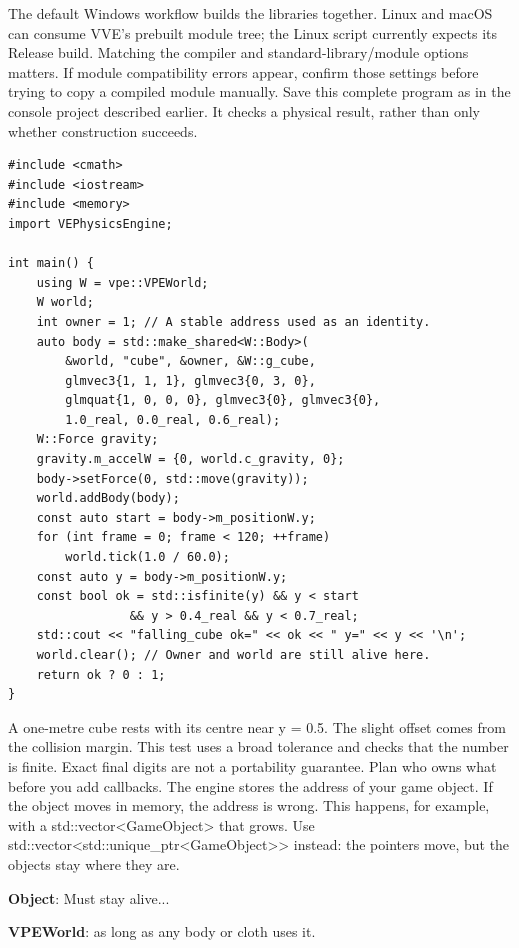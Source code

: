 \documentclass[11pt,a4paper]{article}
\begin{document}
The default Windows workflow builds the libraries together. Linux and macOS can consume VVE's prebuilt module tree; the Linux script currently expects its Release build. Matching the compiler and standard-library/module options matters. If module compatibility errors appear, confirm those settings before trying to copy a compiled module manually.
\label{vpe-core-20}Save this complete program as  in the console project described earlier. It checks a physical result, rather than only whether construction succeeds.%
\begin{lstlisting}
#include <cmath>
#include <iostream>
#include <memory>
import VEPhysicsEngine;

int main() {
    using W = vpe::VPEWorld;
    W world;
    int owner = 1; // A stable address used as an identity.
    auto body = std::make_shared<W::Body>(
        &world, "cube", &owner, &W::g_cube,
        glmvec3{1, 1, 1}, glmvec3{0, 3, 0},
        glmquat{1, 0, 0, 0}, glmvec3{0}, glmvec3{0},
        1.0_real, 0.0_real, 0.6_real);
    W::Force gravity;
    gravity.m_accelW = {0, world.c_gravity, 0};
    body->setForce(0, std::move(gravity));
    world.addBody(body);
    const auto start = body->m_positionW.y;
    for (int frame = 0; frame < 120; ++frame)
        world.tick(1.0 / 60.0);
    const auto y = body->m_positionW.y;
    const bool ok = std::isfinite(y) && y < start
                 && y > 0.4_real && y < 0.7_real;
    std::cout << "falling_cube ok=" << ok << " y=" << y << '\n';
    world.clear(); // Owner and world are still alive here.
    return ok ? 0 : 1;
}
\end{lstlisting}
A one-metre cube rests with its centre near y = 0.5. The slight offset comes from the collision margin. This test uses a broad tolerance and checks that the number is finite. Exact final digits are not a portability guarantee.
\label{vpe-core-21}
Plan who owns what before you add callbacks. The engine stores the address of your game object. If the object moves in memory, the address is wrong. This happens, for example, with a std::vector<GameObject> that grows. Use std::vector<std::unique\_ptr<GameObject>> instead: the pointers move, but the objects stay where they are.

\textbf{Object}: Must stay alive...

\textbf{VPEWorld}: as long as any body or cloth uses it.
\end{document}
